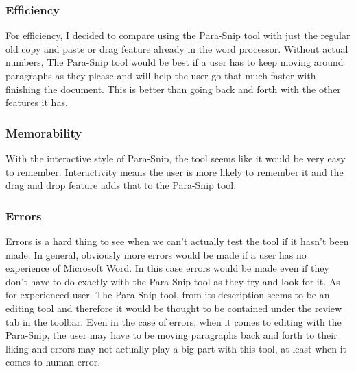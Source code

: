 \documentclass{article}
\begin{document}
\subsubsection{Efficiency} 
	For efficiency, I decided to compare using the Para-Snip tool with just the regular old copy and paste or drag feature already in the word processor. Without actual numbers, The Para-Snip tool would be best if a user has to keep moving around paragraphs as they please and will help the user go that much faster with finishing the document. This is better than going back and forth with the other features it has.

\subsubsection{Memorability} 
	With the interactive style of Para-Snip, the tool seems like it would be very easy to remember. Interactivity means the user is more likely to remember it and the drag and drop feature adds that to the Para-Snip tool.

\subsubsection{Errors} 
	Errors is a hard thing to see when we can't actually test the tool if it hasn't been made. In general, obviously more errors would be made if a user has no experience of Microsoft Word. In this case errors would be made even if they don't have to do exactly with the Para-Snip tool as they try and look for it. As for experienced user. The Para-Snip tool, from its description seems to be an editing tool and therefore it would be thought to be contained under the review tab in the toolbar. Even in the case of errors, when it comes to editing with the Para-Snip, the user may have to be moving paragraphs back and forth to their liking and errors may not actually play a big part with this tool, at least when it comes to human error.
%
%
\end{document}
